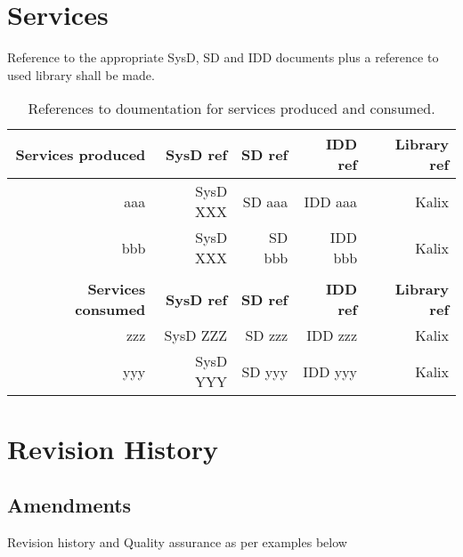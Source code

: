 \documentclass[a4paper]{arrowhead}
\begin{document}
\newpage

\section{Services}
\label{sec:services}

\color{red}
Reference to the appropriate SysD, SD and IDD documents plus a
reference to used library shall be made.

\begin{table*}[ht!]
  \centering
  \caption{References to doumentation for services produced and
    consumed. }
  \label{tab:services}
  \begin{tabular}{|r|r|r|r|r|}
    \hline
    \rowcolor{gray!33}\textbf{Services produced} & \textbf{SysD ref} & \textbf{SD ref} & \textbf{IDD ref} & \textbf{Library ref}\\
    \hline
 
    aaa & SysD XXX & SD aaa & IDD aaa & Kalix \\ \hline
    bbb & SysD XXX & SD bbb & IDD bbb & Kalix \\ \hline

    &&&& \\ \hline

    \rowcolor{gray!33}\textbf{Services consumed} & \textbf{SysD ref} & \textbf{SD ref} & \textbf{IDD ref} & \textbf{Library ref}\\
    \hline
    zzz & SysD ZZZ & SD zzz & IDD zzz & Kalix \\ \hline
    yyy & SysD YYY & SD yyy & IDD yyy & Kalix \\ \hline
    
  \end{tabular}
\end{table*}

\color{black}






\newpage

\section{Revision History}
\subsection{Amendments}

\color{red}
Revision history and Quality assurance as per examples below
\color{black}
\end{document}
